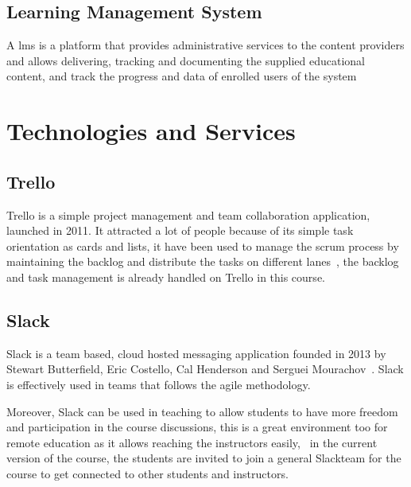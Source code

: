 \subsection{Learning Management System}
\label{sub:lms}

A \ac{lms} is a platform that provides administrative services to the content providers and allows delivering, tracking and
documenting the supplied educational content, and track the progress and data of enrolled users of the system~\cite{lms_1}


\section{Technologies and Services}
\label{sec:technologies}

\subsection{Trello\texttrademark{}}
\label{sub:trello}
Trello\texttrademark{} is a simple project management and team collaboration application, launched in 2011\cite{rao_2011}. It attracted a lot
of people because of its simple task orientation as cards and lists, it have been used to manage the scrum process by maintaining the backlog
and distribute the tasks on different lanes~\cite{trello_scrum}\cite{trello_scrum_2}, the backlog and task management is already handled
on Trello\texttrademark{} in this course.

\subsection{Slack\texttrademark{}}
\label{sub:slack}

Slack\texttrademark{} is a team based, cloud hosted messaging application founded in 2013 by Stewart Butterfield, Eric Costello, Cal Henderson
and Serguei Mourachov~\cite{kumparak_2015}. Slack\texttrademark{} is effectively used in teams that follows the agile methodology.

\newParagraph
Moreover, Slack can be used in teaching to allow students to have more freedom and participation in the course discussions, this is a
great environment too for remote education as it allows reaching the instructors easily,~\cite{medium_slack_2015}\cite{slack_education} in the current
version of the course, the students are invited to join a general Slack\texttrademark team for the course to get connected to
other students and instructors.
